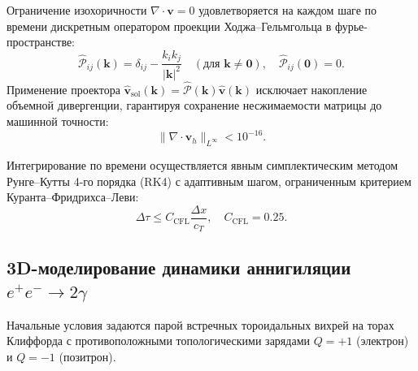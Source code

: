 \documentclass[12pt,a4paper]{article}
\theoremstyle{definition}
\theoremstyle{remark}
\begin{document}
Ограничение изохоричности $\nabla \cdot \mathbf{v} = 0$ удовлетворяется на каждом шаге по времени дискретным оператором проекции Ходжа--Гельмгольца в фурье-пространстве:
\begin{equation}
	\widehat{\mathcal{P}}_{ij}(\mathbf{k}) = \delta_{ij} - \frac{k_i k_j}{|\mathbf{k}|^2} \quad (\text{для } \mathbf{k} \ne \mathbf{0}), \quad \widehat{\mathcal{P}}_{ij}(\mathbf{0}) = 0.
	\label{eq:hodge_projector}
\end{equation}
Применение проектора $\widehat{\mathbf{v}}_{\mathrm{sol}}(\mathbf{k}) = \widehat{\mathcal{P}}(\mathbf{k}) \widehat{\mathbf{v}}(\mathbf{k})$ исключает накопление объемной дивергенции, гарантируя сохранение несжимаемости матрицы до машинной точности:
\begin{equation}
	\|\nabla \cdot \mathbf{v}_h\|_{L^\infty} < 10^{-16}.
	\label{eq:machine_precision_div}
\end{equation}

Интегрирование по времени осуществляется явным симплектическим методом Рунге--Кутты 4-го порядка (RK4) с адаптивным шагом, ограниченным критерием Куранта--Фридрихса--Леви:
\begin{equation}
	\Delta \tau \le C_{\mathrm{CFL}} \frac{\Delta x}{c_T}, \quad C_{\mathrm{CFL}} = 0.25.
	\label{eq:cfl_condition}
\end{equation}

\subsection{3D-моделирование динамики аннигиляции $e^+e^- \to 2\gamma$}
Начальные условия задаются парой встречных тороидальных вихрей на торах Клиффорда с противоположными топологическими зарядами $Q = +1$ (электрон) и $Q = -1$ (позитрон).

\end{document}
